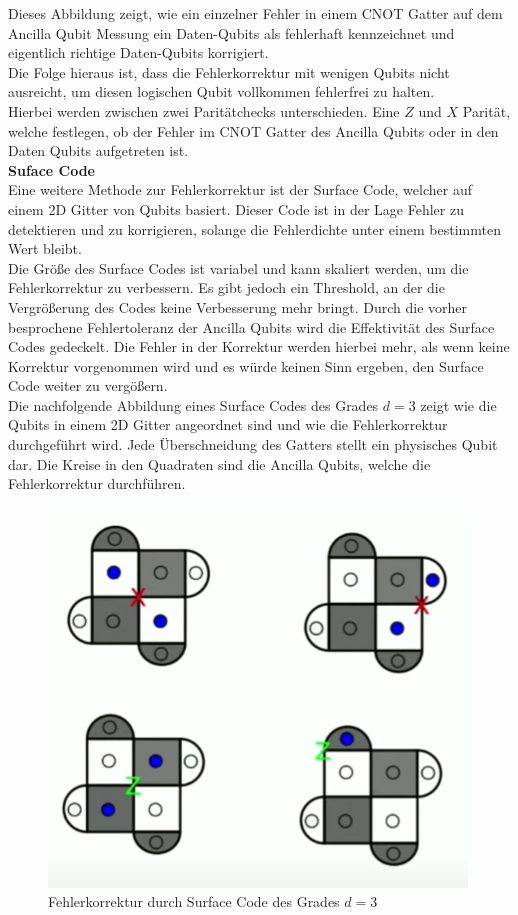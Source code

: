 Dieses Abbildung zeigt, wie ein einzelner Fehler in einem CNOT Gatter auf dem Ancilla Qubit Messung ein Daten-Qubits als fehlerhaft kennzeichnet und eigentlich richtige Daten-Qubits korrigiert.\\
Die Folge hieraus ist, dass die Fehlerkorrektur mit wenigen Qubits nicht ausreicht, um diesen logischen Qubit vollkommen fehlerfrei zu halten.\\

Hierbei werden zwischen zwei Paritätchecks unterschieden. Eine $Z$ und $X$ Parität, welche festlegen, ob der Fehler im CNOT Gatter des Ancilla Qubits oder in den Daten Qubits aufgetreten ist.\\

\textbf{Suface Code}\\
Eine weitere Methode zur Fehlerkorrektur ist der Surface Code, welcher auf einem 2D Gitter von Qubits basiert.
Dieser Code ist in der Lage Fehler zu detektieren und zu korrigieren, solange die Fehlerdichte unter einem bestimmten Wert bleibt.\\

Die Größe des Surface Codes ist variabel und kann skaliert werden, um die Fehlerkorrektur zu verbessern.
Es gibt jedoch ein Threshold, an der die Vergrößerung des Codes keine Verbesserung mehr bringt.
Durch die vorher besprochene Fehlertoleranz der Ancilla Qubits wird die Effektivität des Surface Codes gedeckelt.
Die Fehler in der Korrektur werden hierbei mehr, als wenn keine Korrektur vorgenommen wird und es würde keinen Sinn ergeben, den Surface Code weiter zu vergößern.\\

Die nachfolgende Abbildung eines Surface Codes des Grades $d=3$ zeigt wie die Qubits in einem 2D Gitter angeordnet sind und wie die Fehlerkorrektur durchgeführt wird.
Jede Überschneidung des Gatters stellt ein physisches Qubit dar. Die Kreise in den Quadraten sind die Ancilla Qubits, welche die Fehlerkorrektur durchführen.\\

\begin{figure}[H]
    \centering
    \includegraphics[width=0.6\linewidth]{img/Errors.png}
    \caption{Fehlerkorrektur durch Surface Code des Grades $d=3$ \cite[5m]{qutech_academy_quantum_2018}}
    \label{fig:Surface-Code}
\end{figure}


